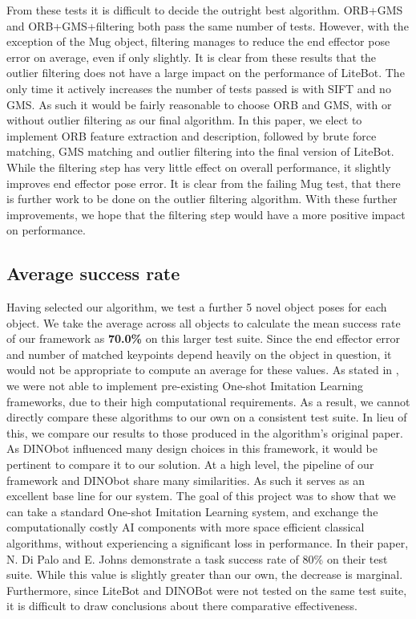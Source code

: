 From these tests it is difficult to decide the outright best algorithm. ORB+GMS and ORB+GMS+filtering both pass the same number of tests. However, with the exception of the Mug object, filtering manages to reduce the end effector pose error on average, even if only slightly. It is clear from these results that the outlier filtering does not have a large impact on the performance of LiteBot. The only time it actively increases the number of tests passed is with SIFT and no GMS. As such it would be fairly reasonable to choose ORB and GMS, with or without outlier filtering as our final algorithm. In this paper, we elect to implement ORB feature extraction and description, followed by brute force matching, GMS matching and outlier filtering into the final version of LiteBot. While the filtering step has very little effect on overall performance, it slightly improves end effector pose error. It is clear from the failing Mug test, that there is further work to be done on the outlier filtering algorithm. With these further improvements, we hope that the filtering step would have a more positive impact on performance.

\subsection{Average success rate}
Having selected our algorithm, we test a further 5 novel object poses for each object. We take the average across all objects to calculate the mean success rate of our framework as \textbf{70.0\%} on this larger test suite. Since the end effector error and number of matched keypoints depend heavily on the object in question, it would not be appropriate to compute an average for these values. As stated in , we were not able to implement pre-existing One-shot Imitation Learning frameworks, due to their high computational requirements. As a result, we cannot directly compare these algorithms to our own on a consistent test suite. In lieu of this, we compare our results to those produced in the algorithm's original paper.\\

As DINObot influenced many design choices in this framework, it would be pertinent to compare it to our solution. At a high level, the pipeline of our framework and DINObot share many similarities. As such it serves as an excellent base line for our system. The goal of this project was to show that we can take a standard One-shot Imitation Learning system, and exchange the computationally costly AI components with more space efficient classical algorithms, without experiencing a significant loss in performance. In their paper, N. Di Palo and E. Johns demonstrate a task success rate of 80\% on their test suite. While this value is slightly greater than our own, the decrease is marginal. Furthermore, since LiteBot and DINOBot were not tested on the same test suite, it is difficult to draw conclusions about there comparative effectiveness.\\

